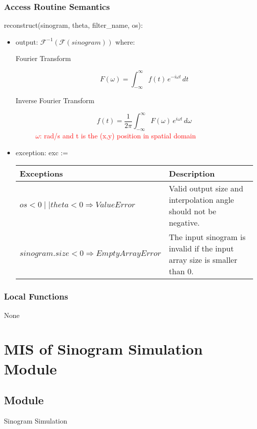 \documentclass[12pt, titlepage]{article}
\newcommand{\add}{\textcolor{red}}
\begin{document}
\subsubsection{Access Routine Semantics}

\noindent reconstruct(sinogram, theta, filter\_name, os):
\begin{itemize}
\item output: \(\mathcal{F}^{-1}(\mathcal{F}(sinogram))\) where:
  \begin{description}
      \item[Fourier Transform]
    \[ F(\omega) = \int_{-\infty}^{\infty} f(t) \, e^{-i \omega t} \, dt\]
    \item[Inverse Fourier Transform]
      \[ f(t) = \frac{1}{2\pi} \int_{-\infty}^{\infty} F(\omega) \, e^{i \omega t} \, d\omega\]
     \add{ \(\omega\): rad/s and t is the (x,y) position in spatial domain}
  \end{description}

  \item exception: exc :=
    \begin{center}
      \begin{tabular}{|m{15em}|m{15em}|}
        \hline
        \textbf{Exceptions} & \textbf{Description} \\
        \hline
        \(os < 0 \mid\mid theta < 0 \Rightarrow ValueError\) & Valid output size and interpolation angle should not be negative. \\
        \hline
        \(sinogram.size < 0 \Rightarrow EmptyArrayError\) & The input sinogram is invalid if the input array size is smaller than 0.\\
        \hline
      \end{tabular}
    \end{center}
\end{itemize}


\subsubsection{Local Functions}
None

\newpage
\section{MIS of Sinogram Simulation Module} \label{ModuleS}

\subsection{Module}
Sinogram Simulation
\end{document}
